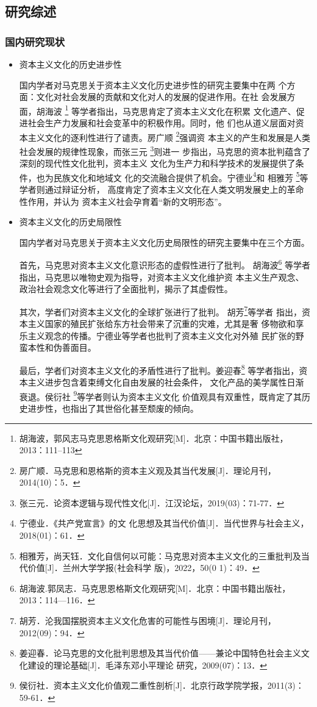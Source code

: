 \subsection{研究综述}
\subsubsection{国内研究现状}
\begin{itemize}
    \item {\heiti 资本主义文化的历史进步性}

    \qquad 国内学者对马克思关于资本主义文化历史进步性的研究主要集中在两
    个方面：文化对社会发展的贡献和文化对人的发展的促进作用。在社
    会发展方面，胡海波 \footnote{胡海波，郭风志马克思恩格斯文化观研究[M]．北京：中国书籍出版社，2013：111--113}
    等学者指出，马克思肯定了资本主义文化在积累
    文化遗产、促进社会生产力发展和社会变革中的积极作用。同时，他
    们也从道义层面对资本主义文化的逐利性进行了谴责。房广顺
    \footnote{房广顺．马克思和恩格斯的资本主义观及其当代发展[J]．理论月刊，2014(10)：5．}强调资
    本主义的产生和发展是人类社会发展的规律性现象，而张三元
    \footnote{张三元．论资本逻辑与现代性文化[J]．江汉论坛，2019(03)：71-77．
    }则进一
    步指出，马克思的资本批判蕴含了深刻的现代性文化批判，资本主义
    文化为生产力和科学技术的发展提供了条件，也为民族文化和地域文
    化的交流融合提供了机会。宁德业\footnote{宁德业．《共产党宣言》的文
    化思想及其当代价值[J]．当代世界与社会主义，2018(01)：61．}和
    相雅芳
    \footnote{相雅芳，尚天钰．文化自信何以可能：马克思对资本主义文化的三重批判及当代价值[J]．兰州大学学报(社会科学 版)，2022，50(0 1)：49．
    }等学者则通过辩证分析，
    高度肯定了资本主义文化在人类文明发展史上的革命性作用，并认为
    资本主义社会孕育着“新的文明形态”。
    \item {\heiti 资本主义文化的历史局限性}
    
    \qquad 国内学者对马克思关于资本主义文化历史局限性的研究主要集中在三个方面。

    \qquad 首先，马克思对资本主义文化意识形态的虚假性进行了批判。
    胡海波\footnote{胡海波.郭凤志．马克思恩格斯文化观研究[M]．北京：中国书籍出版社，2013：114—116．
    }
    等学者指出，马克思以唯物史观为指导，对资本主义文化维护资
    本主义生产观念、政治社会观念文化等进行了全面批判，揭示了其虚假性。
    
    \qquad 其次，学者们对资本主义文化的全球扩张进行了批判。
    胡芳\footnote{胡芳．沦我国摆脱资本主义文化危害的可能性与困境[J]．理论月刊，2012(09)：94．
    }等学者
    指出，资本主义国家的殖民扩张给东方社会带来了沉重的灾难，尤其是奢
    侈物欲和享乐主义观念的传播。宁德业等学者也批判了资本主义文化对外殖
    民扩张的野蛮本性和伪善面目。

    \qquad 最后，学者们对资本主义文化的矛盾性进行了批判。姜迎春\footnote{姜迎春．论马克思的文化批判思想及其当代价值——兼论中国特色社会主义文化建设的理论基础[J]．毛泽东邓小平理论 研究，2009(07)：13．}
    等学者指出，资本主义进步包含着束缚文化自由发展的社会条件，
    文化产品的美学属性日渐衰退。侯衍社
    \footnote{侯衍社．资本主义文化价值观二重性剖析[J]．北京行政学院学报，2011(3)：59-61．
    }等学者则认为资本主义文化
    价值观具有双重性，既肯定了其历史进步性，也指出了其世俗化甚至颓废的倾向。
\end{itemize}

